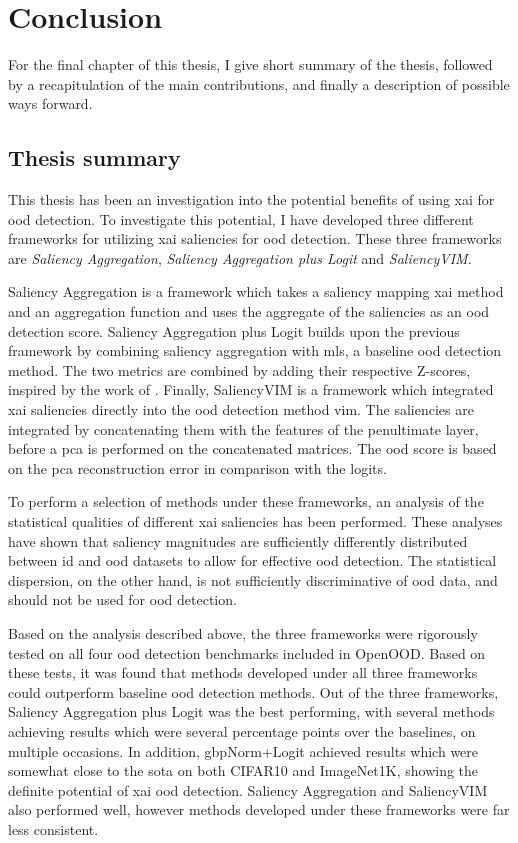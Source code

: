 \documentclass[UKenglish]{uiomasterthesis} %
\theoremstyle{definition}
\begin{document}
\chapter{Conclusion} \label{chapter:conclusion}

For the final chapter of this thesis, I give short summary of the thesis, followed by a recapitulation of the main contributions, and finally a description of possible ways forward.

\section{Thesis summary}

This thesis has been an investigation into the potential benefits of using \ac{xai} for \ac{ood} detection. To investigate this potential, I have developed three different frameworks for utilizing \ac{xai} saliencies for \ac{ood} detection. These three frameworks are {\it Saliency Aggregation}, {\it Saliency Aggregation plus Logit} and {\it SaliencyVIM}.

Saliency Aggregation is a framework which takes a saliency mapping \ac{xai} method and an aggregation function and uses the aggregate of the saliencies as an \ac{ood} detection score. Saliency Aggregation plus Logit builds upon the previous framework by combining saliency aggregation with \ac{mls}, a baseline \ac{ood} detection method. The two metrics are combined by adding their respective Z-scores, inspired by the work of \cite{combood}. Finally, SaliencyVIM is a framework which integrated \ac{xai} saliencies directly into the \ac{ood} detection method \ac{vim}. The saliencies are integrated by concatenating them with the features of the penultimate layer, before a \ac{pca} is performed on the concatenated matrices. The \ac{ood} score is based on the \ac{pca} reconstruction error in comparison with the logits.

To perform a selection of methods under these frameworks, an analysis of the statistical qualities of different \ac{xai} saliencies has been performed. These analyses have shown that saliency magnitudes are sufficiently differently distributed between \ac{id} and \ac{ood} datasets to allow for effective \ac{ood} detection. The statistical dispersion, on the other hand, is not sufficiently discriminative of \ac{ood} data, and should not be used for \ac{ood} detection.

Based on the analysis described above, the three frameworks were rigorously tested on all four \ac{ood} detection benchmarks included in OpenOOD. Based on these tests, it was found that methods developed under all three frameworks could outperform baseline \ac{ood} detection methods. Out of the three frameworks, Saliency Aggregation plus Logit was the best performing, with several methods achieving results which were several percentage points over the baselines, on multiple occasions. In addition, \ac{gbp}Norm+Logit achieved results which were somewhat close to the \ac{sota} on both CIFAR10 and ImageNet1K, showing the definite potential of \ac{xai} \ac{ood} detection. Saliency Aggregation and SaliencyVIM also performed well, however methods developed under these frameworks were far less consistent.
\end{document}

